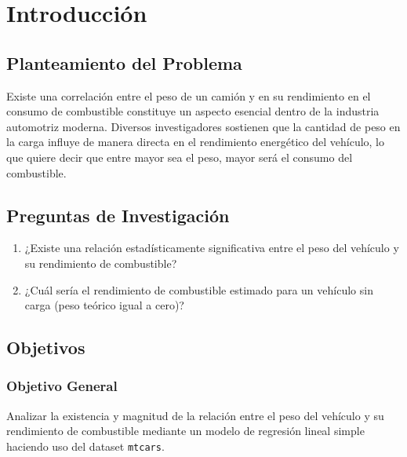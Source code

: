 \documentclass[12pt, letterpaper]{article}
\begin{document}
    \newpage
    \setcounter{page}{2}

    \section{Introducción}

    \subsection{Planteamiento del Problema}

    Existe una correlación entre el peso de un camión y en su rendimiento en el consumo de combustible constituye un aspecto esencial dentro de la industria automotriz moderna. Diversos investigadores sostienen que la cantidad de peso en la carga influye de manera directa en el rendimiento energético  del vehículo, lo que quiere decir que entre mayor sea el peso, mayor será el consumo del combustible.

    \subsection{Preguntas de Investigación}

    \begin{enumerate}
        \item ¿Existe una relación estadísticamente significativa entre el peso del
            vehículo y su rendimiento de combustible?

        \item ¿Cuál sería el rendimiento de combustible estimado para un vehículo
            sin carga (peso teórico igual a cero)?
    \end{enumerate}

    \subsection{Objetivos}

    \subsubsection{Objetivo General}

 Analizar  la existencia y magnitud de la relación entre el peso del vehículo
    y su rendimiento de combustible mediante un modelo de regresión lineal simple haciendo uso del dataset \texttt{mtcars}.
\end{document}
